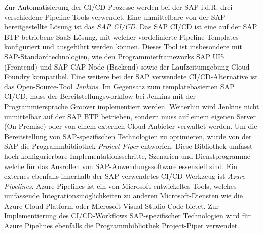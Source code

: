 Zur Automatisierung der CI/CD-Prozesse werden bei der SAP i.d.R. drei verschiedene Pipeline-Tools verwendet. Eine unmittelbare von der SAP bereitgestellte Lösung ist das \textit{\ac{SAP CI/CD}}. Das SAP CI/CD ist eine auf der SAP BTP betriebene SaaS-Lösung, mit welcher vordefinierte Pipeline-Templates konfiguriert und ausgeführt werden können. Dieses Tool ist insbesondere mit SAP-Standardtechnologien, wie den Programmierframeworks SAP UI5 (Frontend) und SAP CAP Node (Backend) sowie der Laufzeitumgebung Cloud-Foundry kompatibel. Eine weitere bei der SAP verwendete CI/CD-Alternative ist das Open-Source-Tool \textit{Jenkins}. Im Gegensatz zum templatebasierten SAP CI/CD, muss der Bereitstellungsworkflow bei Jenkins mit der Programmiersprache Groover implementiert werden. Weiterhin wird Jenkins nicht unmittelbar auf der SAP BTP betrieben, sondern muss auf einem eigenen Server (On-Premise) oder von einem externen Cloud-Anbieter verwaltet werden. Um die Bereitstellung von SAP-spezifischen Technologien zu optimieren, wurde von der SAP die Programmbibliothek \textit{Project Piper} entworfen. Diese Bibliothek umfasst hoch konfigurierbare Implementationsschritte, Szenarien und Dienstprogramme welche für das Ausrollen von SAP-Anwendungssoftware essenziell sind.
Ein externes ebenfalls innerhalb der SAP verwendetes CI/CD-Werkzeug ist \textit{Azure Pipelines}. Azure Pipelines ist ein von Microsoft entwickeltes Tools, welches umfassende Integrationsmöglichkeiten zu anderen Microsoft-Diensten wie die Azure-Cloud-Platform oder Microsoft Visual Studio Code bietet. Zur Implementierung des CI/CD-Workflows SAP-spezifischer Technologien wird für Azure Pipelines ebenfalls die Programmbibliothek Project-Piper verwendet.
